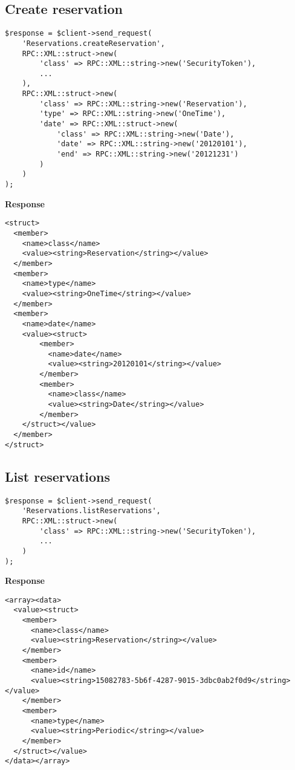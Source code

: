 \documentclass[a4paper]{report}
\begin{document}
\newpage
\subsection{Create reservation}
\begin{verbatim}
$response = $client->send_request(
    'Reservations.createReservation',
    RPC::XML::struct->new(
        'class' => RPC::XML::string->new('SecurityToken'),
        ...
    ),
    RPC::XML::struct->new(
        'class' => RPC::XML::string->new('Reservation'),
        'type' => RPC::XML::string->new('OneTime'),
        'date' => RPC::XML::struct->new(
            'class' => RPC::XML::string->new('Date'),
            'date' => RPC::XML::string->new('20120101'),
            'end' => RPC::XML::string->new('20121231')
        )
    )
);
\end{verbatim}
\textbf{Response}
{\small\begin{verbatim}
<struct>
  <member>
    <name>class</name>
    <value><string>Reservation</string></value>
  </member>
  <member>
    <name>type</name>
    <value><string>OneTime</string></value>
  </member>
  <member>
    <name>date</name>
    <value><struct>
        <member>
          <name>date</name>
          <value><string>20120101</string></value>
        </member>
        <member>
          <name>class</name>
          <value><string>Date</string></value>
        </member>
    </struct></value>
  </member>
</struct>
\end{verbatim}}

\newpage
\subsection{List reservations}
\begin{verbatim}
$response = $client->send_request(
    'Reservations.listReservations',
    RPC::XML::struct->new(
        'class' => RPC::XML::string->new('SecurityToken'),
        ...
    )
);
\end{verbatim}
\textbf{Response}
{\small\begin{verbatim}
<array><data>
  <value><struct>
    <member>
      <name>class</name>
      <value><string>Reservation</string></value>
    </member>
    <member>
      <name>id</name>
      <value><string>15082783-5b6f-4287-9015-3dbc0ab2f0d9</string></value>
    </member>
    <member>
      <name>type</name>
      <value><string>Periodic</string></value>
    </member>
  </struct></value>
</data></array>
\end{verbatim}}





\end{document}
